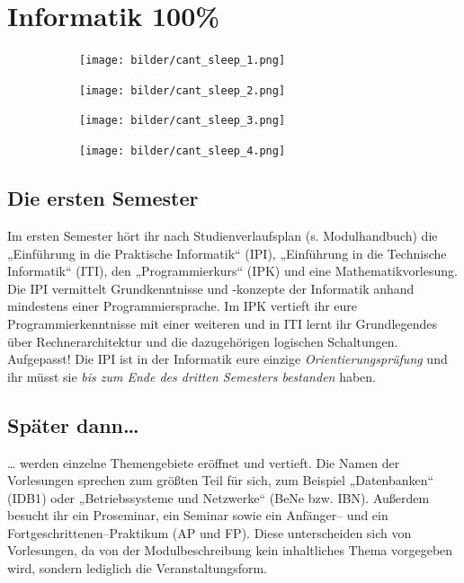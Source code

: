 \section{Informatik 100\%}

\begin{figure}[b]
    \begin{subfigure}{.23\textwidth}
	    \texttt{[image: bilder/cant\_sleep\_1.png]}
    \end{subfigure}
    \hfill
    \begin{subfigure}{.23\textwidth}
	    \texttt{[image: bilder/cant\_sleep\_2.png]}
    \end{subfigure}
    \hfill
    \begin{subfigure}{.23\textwidth}
	    \texttt{[image: bilder/cant\_sleep\_3.png]}
    \end{subfigure}
    \hfill
    \begin{subfigure}{.23\textwidth}
	    \texttt{[image: bilder/cant\_sleep\_4.png]}
    \end{subfigure}

\end{figure}

\subsection{Die ersten Semester}

Im ersten Semester hört ihr nach Studienverlaufsplan (s. Modulhandbuch) die „Einführung in die Praktische Informatik“ (\gls{IPI}), „Einführung in die Technische Informatik“ (\gls{ITI}), den „Programmierkurs“ (\gls{IPK}) und eine Mathematikvorlesung. Die IPI vermittelt Grundkenntnisse und -konzepte der Informatik anhand mindestens einer Programmiersprache. Im IPK vertieft ihr eure Programmierkenntnisse mit einer weiteren und in ITI lernt ihr Grundlegendes über Rechnerarchitektur und die dazugehörigen logischen Schaltungen. Aufgepasst! Die IPI ist in der Informatik eure einzige \emph{Orientierungsprüfung} und ihr müsst sie \emph{bis zum Ende des dritten Semesters bestanden} haben.


\subsection{Später dann\dots{}}

\dots{} werden einzelne Themengebiete eröffnet und vertieft. Die Namen der Vorlesungen sprechen zum größten Teil für sich, zum Beispiel „Datenbanken“ (\gls{IDB1}) oder „Betriebssysteme und Netzwerke“ (\gls{BeNe} bzw. IBN). Außerdem besucht ihr ein Proseminar, ein Seminar sowie ein An\-fän\-ger-- und ein Fortgeschrittenen--Praktikum (\gls{AP} und \gls{FP}). Diese unterscheiden sich von Vorlesungen, da von der Modulbeschreibung kein inhaltliches Thema vorgegeben wird, sondern lediglich die Veranstaltungsform.


